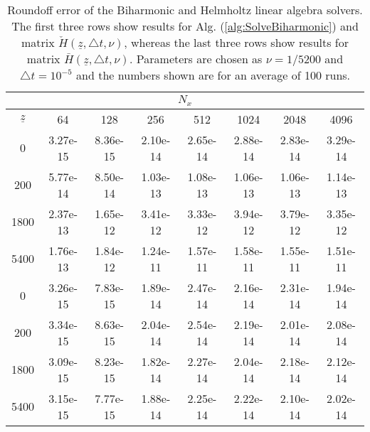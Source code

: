 \documentclass[preprint]{elsarticle}
\newcommand{\N}[1]{\check{#1}}
\newcommand{\D}[1]{\bar{#1}}
\begin{document}
\begin{table}
	\caption{ Roundoff error of the Biharmonic and Helmholtz linear algebra solvers. The first three 
	rows show results for Alg. (\ref{alg:SolveBiharmonic}) and matrix $\N{H}(\underline{z}, 
	\triangle t, \nu)$, whereas the last three rows show results for matrix 
	$\D{H}(\underline{z}, \triangle t, \nu)$. Parameters 
	are chosen as $\nu=1/5200$ and $\triangle t=10^{-5}$ and the numbers shown 
	are for an average of 100 runs.	 \label{tab:roundoff}}
\centering
   \begin{tabular}{cccccccc}
	   \multicolumn{8}{c}{$N_x$} \\
	   \hline
$\underline{z}$ & 64 & 128 & 256 & 512 & 1024 & 2048 & 4096 \\ 
\hline
0 & 3.27e-15  & 8.36e-15  & 2.10e-14  & 2.65e-14  & 2.88e-14  & 2.83e-14  & 3.29e-14  \\ 
200 & 5.77e-14  & 8.50e-14  & 1.03e-13  & 1.08e-13  & 1.06e-13  & 1.06e-13  & 1.14e-13  \\ 
1800 & 2.37e-13  & 1.65e-12  & 3.41e-12  & 3.33e-12  & 3.94e-12  & 3.79e-12  & 3.35e-12  \\ 
5400 & 1.76e-13  & 1.84e-12  & 1.24e-11  & 1.57e-11  & 1.58e-11  & 1.55e-11  & 1.51e-11  \\ 
\hline
0 & 3.26e-15  & 7.83e-15  & 1.89e-14  & 2.47e-14  & 2.16e-14  & 2.31e-14  & 1.94e-14  \\ 
200 & 3.34e-15  & 8.63e-15  & 2.04e-14  & 2.54e-14  & 2.19e-14  & 2.01e-14  & 2.08e-14  \\ 
1800 & 3.09e-15  & 8.23e-15  & 1.82e-14  & 2.27e-14  & 2.04e-14  & 2.18e-14  & 2.12e-14  \\ 
5400 & 3.15e-15  & 7.77e-15  & 1.88e-14  & 2.25e-14  & 2.22e-14  & 2.10e-14  & 2.02e-14 
		
\end{tabular}
\end{table}
\end{document}
